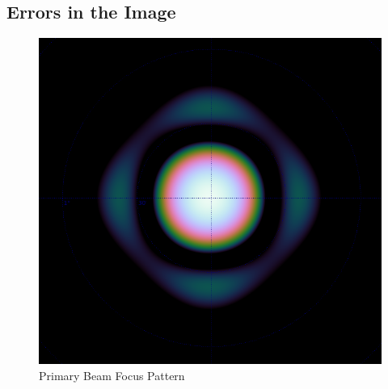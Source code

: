 \subsection{Errors in the Image}\label{int:sec:err}
\begin{figure}[H]
	\centering
	\label{int:fig:beam}
	\includegraphics[scale=0.28]{Images/beam.png}
	\caption{Primary Beam Focus Pattern\cite{oleg}}
\end{figure}
